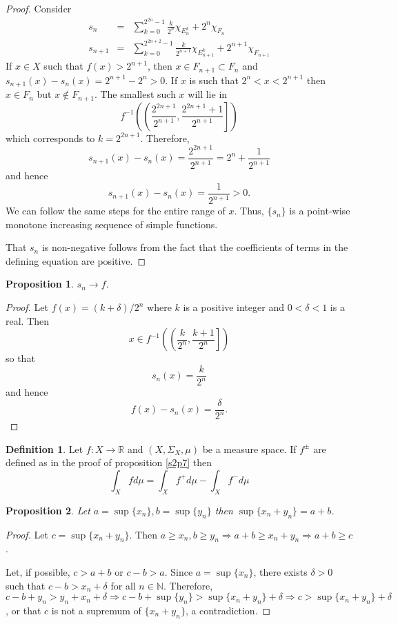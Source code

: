 \documentclass{article}
\newcommand{\sor}{\mathbb{R}}
\newcommand{\son}{\mathbb{N}}
\theoremstyle{plain}
\numberwithin{thm}{section}
\theoremstyle{plain}
\newtheorem{prop}{Proposition}
\numberwithin{prop}{section}
\theoremstyle{definition}
\newtheorem{defn}{Definition}
\numberwithin{defn}{section}
\theoremstyle{remark}
\theoremstyle{plain}
\numberwithin{cor}{section}
\numberwithin{equation}{section}
\begin{document}
\begin{proof}
Consider
\begin{eqnarray*}
s_n &=& \sum_{k=0}^{2^{2n}-1}\frac{k}{2^n}\chi_{E_n^k} + 2^n\chi_{F_n} \\
s_{n+1} &=& \sum_{k=0}^{2^{2n+2}-1}\frac{k}{2^{n+1}}\chi_{E_{n+1}^k} + 2^{n+1}\chi_{F_{n+1}}
\end{eqnarray*}
If $x \in X$ such that $f(x) > 2^{n+1}$, then $x \in F_{n+1} \subset F_n$ and 
$s_{n+1}(x) - s_n(x) = 2^{n+1} - 2^n > 0$.
If $x$ is such that $2^n < x < 2^{n+1}$ then $x \in F_n$ but $x \notin F_{n+1}$.
The smallest such $x$ will lie in
\[
f^{-1}\left(\left(\frac{2^{2n+1}}{2^{n+1}}, \frac{2^{2n+1} + 1}{2^{n+1}}\right]\right)
\]
which corresponds to $k = 2^{2n+1}$. Therefore,
\[
s_{n+1}(x) - s_n(x) = \frac{2^{2n+1}}{2^{n+1}} = 2^n + \frac{1}{2^{n+1}}
\]
and hence
\[
s_{n+1}(x) - s_n(x) = \frac{1}{2^{n+1}} > 0.
\]
We can follow the same steps for the entire range of $x$. Thus, $\{s_n\}$ is a
point-wise monotone increasing sequence of simple functions.

That $s_n$ is non-negative follows from the fact that the coefficients of terms
in the defining equation are positive.
\end{proof}

\begin{prop}\label{s3p7}
$s_n \rightarrow f$.
\end{prop}
\begin{proof}
Let $f(x) = (k + \delta)/2^n$ where $k$ is a positive integer and $0 < \delta < 1$
is a real. Then 
\[
x \in f^{-1}\left(\left(\frac{k}{2^n}, \frac{k+1}{2^n}\right]\right)
\]
so that
\[
s_n(x) = \frac{k}{2^n}
\]
and hence
\[
f(x) - s_n(x) = \frac{\delta}{2^n}.
\]
\end{proof}

\begin{defn}\label{s3d4}
Let $f:X \rightarrow \sor$ and $(X, \Sigma_X, \mu)$ be a measure space. If $f^{\pm}$
are defined as in the proof of proposition \ref{s2p7} then
\[
\int_X f d\mu = \int_X f^+ d\mu - \int_X f^-d\mu
\]
\end{defn}

\begin{prop}\label{s3p8}
Let $a = \sup\{x_n\}, b = \sup\{y_n\}$ then $\sup\{x_n + y_n\} = a + b$.
\end{prop}
\begin{proof}
Let $c = \sup\{x_n + y_n\}$. Then $a \ge x_n, b \ge y_n \Rightarrow a+ b \ge x_n + y_n
\Rightarrow a + b \ge c$. 

Let, if possible, $c > a + b$ or $c - b > a$. Since $a = \sup\{x_n\}$, there 
exists $\delta > 0$ such that $c - b > x_n + \delta$ for all $n \in \son$.
Therefore, $c - b + y_n > y_n + x_n + \delta \Rightarrow c - b + \sup\{y_n\}
> \sup\{x_n + y_n\} + \delta \Rightarrow c > \sup\{x_n + y_n\} + \delta$, or
that $c$ is not a supremum of $\{x_n + y_n\}$, a contradiction.
\end{proof}
\end{document}
